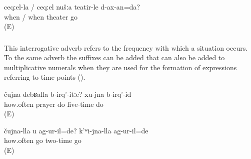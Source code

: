 %
\begin{exe}
	\ex	\label{ex:When will we go to the theater?}
	\gll	ceqːel-la	/	ceqːel	nušːa	teatir-le	d-ax-an=da?\\
		when	/	when		theater	go\\
	\glt	{} (E)
\end{exe}



\subsubsection{ }
\label{sssec:cujna how many times}

This interrogative adverb refers to the frequency with which a situation occurs. To the same adverb the suffixes can be added that can also be added to multiplicative numerals when they are used for the formation of expressions referring to time points  ().
%
\begin{exe}
	\ex	\label{ex:How many times do you pray (every day)? I pray five times}
	\gll	čujna	debʁalla	b-irq'-itːe? 	xu-jna	b-irq'-id\\
		how.often	prayer	do 	five-time	do\\
	\glt	{} (E)
\end{exe}

%
\begin{exe}
	\ex	\label{ex:At which time did you go? I went at the second time.}
	\gll	čujna-lla	u	ag-ur-il=de?	k'ʷi-jna-lla	ag-ur-il=de\\
		how.often		go	two-time	go\\
	\glt	{} (E)
\end{exe}



